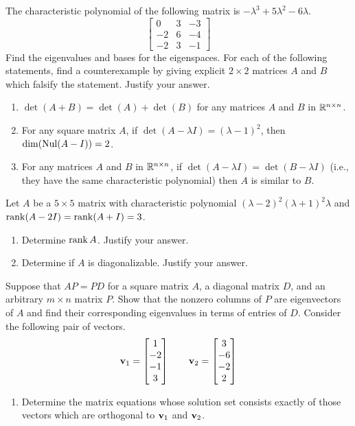 \begin{tasks}[resume, style=enumerate]
\task
  The characteristic polynomial of the following matrix is
  $-\lambda^3+5\lambda^2-6\lambda$.
  \begin{displaymath}
    \begin{bmatrix}
      0 & 3  & -3 \\
      -2 & 6 & -4 \\
      -2 & 3 & -1
    \end{bmatrix}
  \end{displaymath}
  Find the eigenvalues and bases for the eigenspaces.
\task
  For each of the following statements, find a counterexample by giving
  explicit $2 \times 2$ matrices $A$ and $B$ which falsify the
  statement.  Justify your answer.
  \begin{enumerate}[label=(\alph*)]
  \item
    $\det(A + B) = \det(A) + \det(B)$ for any matrices $A$ and $B$ in
    $\mathbb R^{n\times n}$.
  \item
    For any square matrix $A$, if $\det(A - \lambda I) = (\lambda - 1)^2$,
    then $\dim(\operatorname{\mathrm{Nul}} (A - I)) = 2$.
  \item
    For any matrices $A$ and $B$ in $\mathbb R^{n \times n}$, if $\det(A -
    \lambda I) = \det(B - \lambda I)$ (i.e., they have the same
    characteristic polynomial) then $A$ is similar to $B$.
  \end{enumerate}
\task
  Let $A$ be a $5 \times 5$ matrix with characteristic polynomial
  $(\lambda - 2)^2 (\lambda + 1)^2 \lambda$ and $\operatorname{\mathrm{rank}}(A - 2I) =
  \operatorname{\mathrm{rank}}(A + I) = 3$.
  \begin{enumerate}[label=(\alph*)]
  \item
    Determine $\operatorname{\mathrm{rank}} A$. Justify your answer.
  \item
    Determine if $A$ is diagonalizable. Justify your answer.
  \end{enumerate}
\task
  Suppose that $AP = PD$ for a square matrix $A$, a diagonal matrix $D$,
  and an arbitrary $m \times n$ matrix $P$. Show that the nonzero columns
  of $P$ are eigenvectors of $A$ and find their corresponding
  eigenvalues in terms of entries of $D$.
\task
  Consider the following pair of vectors.
  \begin{align*}
    \mathbf v_1 =  \begin{bmatrix} 1 \\ -2 \\ -1 \\ 3 \end{bmatrix} 
    \qquad
    \mathbf v_2 =  \begin{bmatrix} 3 \\ -6 \\ -2 \\ 2 \end{bmatrix} 
  \end{align*}
  \begin{enumerate}[label=(\alph*)]
  \item
    Determine the matrix equations whose solution set consists exactly
    of those vectors which are orthogonal to $\mathbf v_1$ and $\mathbf v_2$.

\end{enumerate}
\end{tasks}
